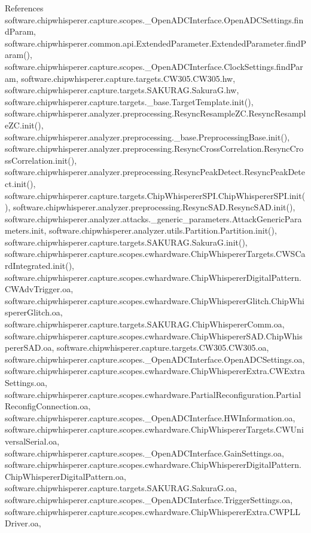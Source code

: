 References software.\+chipwhisperer.\+capture.\+scopes.\+\_\+\+Open\+A\+D\+C\+Interface.\+Open\+A\+D\+C\+Settings.\+find\+Param, software.\+chipwhisperer.\+common.\+api.\+Extended\+Parameter.\+Extended\+Parameter.\+find\+Param(), software.\+chipwhisperer.\+capture.\+scopes.\+\_\+\+Open\+A\+D\+C\+Interface.\+Clock\+Settings.\+find\+Param, software.\+chipwhisperer.\+capture.\+targets.\+C\+W305.\+C\+W305.\+hw, software.\+chipwhisperer.\+capture.\+targets.\+S\+A\+K\+U\+R\+A\+G.\+Sakura\+G.\+hw, software.\+chipwhisperer.\+capture.\+targets.\+\_\+base.\+Target\+Template.\+init(), software.\+chipwhisperer.\+analyzer.\+preprocessing.\+Resync\+Resample\+Z\+C.\+Resync\+Resample\+Z\+C.\+init(), software.\+chipwhisperer.\+analyzer.\+preprocessing.\+\_\+base.\+Preprocessing\+Base.\+init(), software.\+chipwhisperer.\+analyzer.\+preprocessing.\+Resync\+Cross\+Correlation.\+Resync\+Cross\+Correlation.\+init(), software.\+chipwhisperer.\+analyzer.\+preprocessing.\+Resync\+Peak\+Detect.\+Resync\+Peak\+Detect.\+init(), software.\+chipwhisperer.\+capture.\+targets.\+Chip\+Whisperer\+S\+P\+I.\+Chip\+Whisperer\+S\+P\+I.\+init(), software.\+chipwhisperer.\+analyzer.\+preprocessing.\+Resync\+S\+A\+D.\+Resync\+S\+A\+D.\+init(), software.\+chipwhisperer.\+analyzer.\+attacks.\+\_\+generic\+\_\+parameters.\+Attack\+Generic\+Parameters.\+init, software.\+chipwhisperer.\+analyzer.\+utils.\+Partition.\+Partition.\+init(), software.\+chipwhisperer.\+capture.\+targets.\+S\+A\+K\+U\+R\+A\+G.\+Sakura\+G.\+init(), software.\+chipwhisperer.\+capture.\+scopes.\+cwhardware.\+Chip\+Whisperer\+Targets.\+C\+W\+S\+Card\+Integrated.\+init(), software.\+chipwhisperer.\+capture.\+scopes.\+cwhardware.\+Chip\+Whisperer\+Digital\+Pattern.\+C\+W\+Adv\+Trigger.\+oa, software.\+chipwhisperer.\+capture.\+scopes.\+cwhardware.\+Chip\+Whisperer\+Glitch.\+Chip\+Whisperer\+Glitch.\+oa, software.\+chipwhisperer.\+capture.\+targets.\+S\+A\+K\+U\+R\+A\+G.\+Chip\+Whisperer\+Comm.\+oa, software.\+chipwhisperer.\+capture.\+scopes.\+cwhardware.\+Chip\+Whisperer\+S\+A\+D.\+Chip\+Whisperer\+S\+A\+D.\+oa, software.\+chipwhisperer.\+capture.\+targets.\+C\+W305.\+C\+W305.\+oa, software.\+chipwhisperer.\+capture.\+scopes.\+\_\+\+Open\+A\+D\+C\+Interface.\+Open\+A\+D\+C\+Settings.\+oa, software.\+chipwhisperer.\+capture.\+scopes.\+cwhardware.\+Chip\+Whisperer\+Extra.\+C\+W\+Extra\+Settings.\+oa, software.\+chipwhisperer.\+capture.\+scopes.\+cwhardware.\+Partial\+Reconfiguration.\+Partial\+Reconfig\+Connection.\+oa, software.\+chipwhisperer.\+capture.\+scopes.\+\_\+\+Open\+A\+D\+C\+Interface.\+H\+W\+Information.\+oa, software.\+chipwhisperer.\+capture.\+scopes.\+cwhardware.\+Chip\+Whisperer\+Targets.\+C\+W\+Universal\+Serial.\+oa, software.\+chipwhisperer.\+capture.\+scopes.\+\_\+\+Open\+A\+D\+C\+Interface.\+Gain\+Settings.\+oa, software.\+chipwhisperer.\+capture.\+scopes.\+cwhardware.\+Chip\+Whisperer\+Digital\+Pattern.\+Chip\+Whisperer\+Digital\+Pattern.\+oa, software.\+chipwhisperer.\+capture.\+targets.\+S\+A\+K\+U\+R\+A\+G.\+Sakura\+G.\+oa, software.\+chipwhisperer.\+capture.\+scopes.\+\_\+\+Open\+A\+D\+C\+Interface.\+Trigger\+Settings.\+oa, software.\+chipwhisperer.\+capture.\+scopes.\+cwhardware.\+Chip\+Whisperer\+Extra.\+C\+W\+P\+L\+L\+Driver.\+oa, 